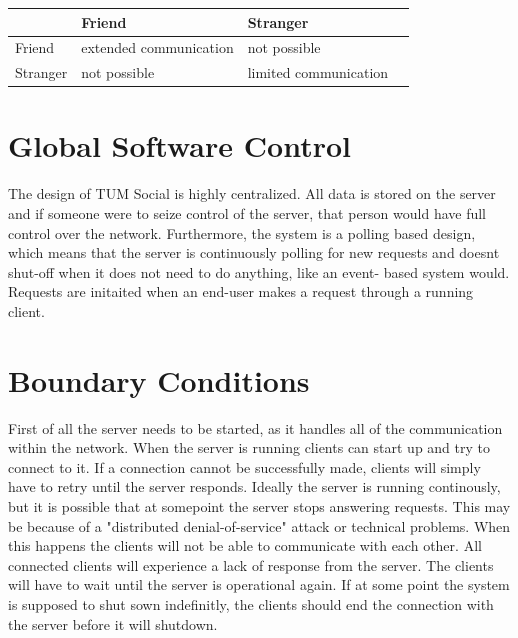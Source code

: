 \documentclass[a4paper,12pt]{scrartcl}
\begin{document}
    \begin{tabular}{    
	    |p{}%
        |p{}%
        |p{}
        |p{}|%
    }
        \hline
         & Friend & Stranger         \\
        \hline
        Friend   & extended communication  & not possible \\
        \hline
        Stranger & not possible & limited communication         \\
       
        \hline
    \end{tabular}


    \section{Global Software Control}
    
    The design of TUM Social is highly centralized. All data is stored on the server and if someone were to seize control of the server, that person would have full control over the network.
    Furthermore, the system is a polling based design, which means that the server is continuously polling for new requests and doesnt shut-off when it does not need to do anything, like an event-			based system would. Requests are initaited when an end-user makes a request through a running client. 


    \section{Boundary Conditions}
   First of all the server needs to be started, as it handles all of the communication within the network. When the server is running clients can start up and try to connect to it. If a connection cannot be successfully made, clients will simply have to retry until the server responds. Ideally the server is running continously, but it is possible that at somepoint the server stops answering requests. This may be because of a "distributed denial-of-service" attack or technical problems. When this happens the clients will not be able to communicate with each other. All connected clients will experience a lack of response from the server. The clients will have to wait until the server is operational again. If at some point the system is supposed to shut sown indefinitly, the clients should end the connection with the server before it will shutdown.\\
\end{document}
